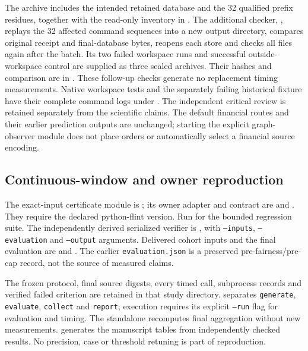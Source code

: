 \documentclass[11pt,a4paper]{article}
\theoremstyle{definition}\newtheorem{definition}[theorem]{Definition}
\begin{document}
The archive includes the intended retained database and the 32 qualified
prefix residues, together with the read-only inventory in
. The additional checker,
, replays the
32 affected command sequences into a new output directory, compares original
receipt and final-database bytes, reopens each store and checks all files again
after the batch. Its two failed workspace runs and successful outside-workspace
control are supplied as three sealed archives. Their hashes and comparison
are in .
These follow-up checks generate no replacement timing measurements. Native workspace tests and
the separately failing historical fixture have their complete command logs
under .
The independent critical review is retained separately from the scientific
claims. The default financial routes and their earlier prediction outputs are
unchanged; starting the explicit graph-observer module does not place orders
or automatically select a financial source encoding.

\subsection{Continuous-window and owner reproduction}\label{sec:windowreproduction}
The exact-input certificate module is ; its owner adapter and contract are  and . They require the declared python-flint version. Run  for the bounded regression suite. The independently derived serialized verifier is , with \texttt{--inputs}, \texttt{--evaluation} and \texttt{--output} arguments. Delivered cohort inputs and the final evaluation are  and . The earlier \texttt{evaluation.json} is a preserved pre-fairness/pre-cap record, not the source of measured claims.

The frozen protocol, final source digests, every timed call, subprocess records and verified failed criterion are retained in that study directory.  separates \texttt{generate}, \texttt{evaluate}, \texttt{collect} and \texttt{report}; execution requires its explicit \texttt{--run} flag for evaluation and timing. The standalone  recomputes final aggregation without new measurements.  generates the manuscript tables from independently checked results. No precision, case or threshold retuning is part of reproduction.
\end{document}
